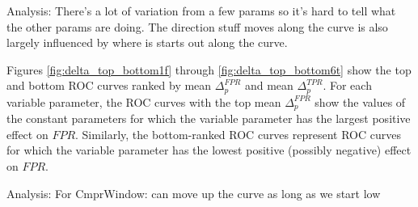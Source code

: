 Analysis: There's a lot of variation from a few params so it's hard to tell what the other params are doing. The direction stuff moves along the curve is also largely influenced by where is starts out along the curve.

\clearpage
Figures \ref{fig:delta_top_bottom1f} through \ref{fig:delta_top_bottom6t} show the top
and bottom ROC curves ranked by mean $\Delta_p^{FPR}$ and mean
$\Delta_p^{TPR}$. For each variable parameter, the ROC curves with the top mean
$\Delta_p^{FPR}$ show the values of the constant parameters for which the
variable parameter has the largest positive effect on $FPR$. Similarly, the
bottom-ranked ROC curves represent ROC curves for which the variable parameter
has the lowest positive (possibly negative) effect on $FPR$.


Analysis:
For CmprWindow: can move up the curve as long as we start low

